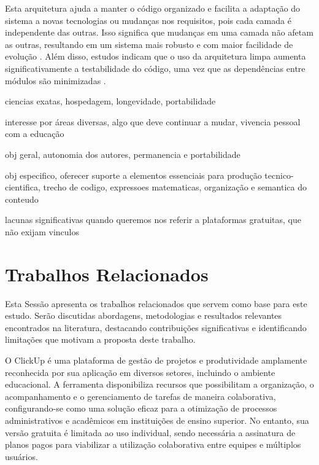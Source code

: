 Esta arquitetura ajuda a manter o código organizado e facilita a adaptação do sistema a novas tecnologias ou mudanças nos requisitos, pois cada camada é independente das outras. Isso significa que mudanças em uma camada não afetam as outras, resultando em um sistema mais robusto e com maior facilidade de evolução \cite{silva2018arquiteturalimpa}. Além disso, estudos indicam que o uso da arquitetura limpa aumenta significativamente a testabilidade do código, uma vez que as dependências entre módulos são minimizadas \cite{pereira2020testabilidadearquitetura}.






ciencias exatas, hospedagem, longevidade, portabilidade

interesse por áreas diversas, algo que deve continuar a mudar, vivencia pessoal com a educação

obj geral, autonomia dos autores, permanencia e portabilidade

obj especifico, oferecer suporte a elementos essenciais para produção tecnico-cientifica,
trecho de codigo, expressoes matematicas, organização e semantica do conteudo

lacunas significativas quando queremos nos referir a plataformas gratuitas, que não exijam vinculos

\section{Trabalhos Relacionados}

Esta Sessão apresenta os trabalhos relacionados que servem como base para este estudo. Serão discutidas abordagens, metodologias e resultados relevantes encontrados na literatura, destacando contribuições significativas e identificando limitações que motivam a proposta deste trabalho.


O ClickUp \cite{clickup} é uma plataforma de gestão de projetos e produtividade amplamente reconhecida por sua aplicação em diversos setores, incluindo o ambiente educacional. A ferramenta disponibiliza recursos que possibilitam a organização, o acompanhamento e o gerenciamento de tarefas de maneira colaborativa, configurando-se como uma solução eficaz para a otimização de processos administrativos e acadêmicos em instituições de ensino superior. No entanto, sua versão gratuita é limitada ao uso individual, sendo necessária a assinatura de planos pagos para viabilizar a utilização colaborativa entre equipes e múltiplos usuários.

